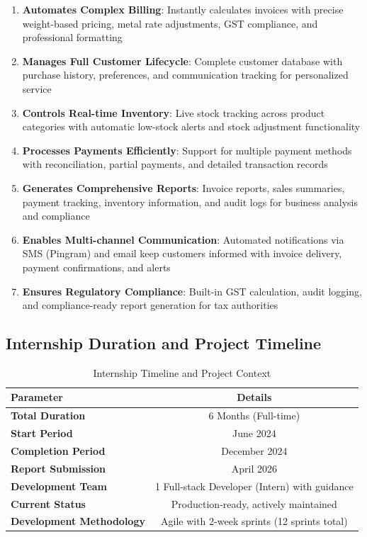\documentclass[12pt,a4paper]{report}
\begin{document}
\begin{enumerate}[label=\roman*)]
    \item \textbf{Automates Complex Billing}: Instantly calculates invoices with precise weight-based pricing, metal rate adjustments, GST compliance, and professional formatting
    \item \textbf{Manages Full Customer Lifecycle}: Complete customer database with purchase history, preferences, and communication tracking for personalized service
    \item \textbf{Controls Real-time Inventory}: Live stock tracking across product categories with automatic low-stock alerts and stock adjustment functionality
    \item \textbf{Processes Payments Efficiently}: Support for multiple payment methods with reconciliation, partial payments, and detailed transaction records
    \item \textbf{Generates Comprehensive Reports}: Invoice reports, sales summaries, payment tracking, inventory information, and audit logs for business analysis and compliance
    \item \textbf{Enables Multi-channel Communication}: Automated notifications via SMS (Pingram) and email keep customers informed with invoice delivery, payment confirmations, and alerts
    \item \textbf{Ensures Regulatory Compliance}: Built-in GST calculation, audit logging, and compliance-ready report generation for tax authorities
\end{enumerate}

\subsection{Internship Duration and Project Timeline}

\begin{table}[H]
    \centering
    \begin{tabular}{|l|c|}
        \hline
        \textbf{Parameter} & \textbf{Details} \\
        \hline
        \textbf{Total Duration} & 6 Months (Full-time) \\
        \hline
        \textbf{Start Period} & June 2024 \\
        \hline
        \textbf{Completion Period} & December 2024 \\
        \hline
        \textbf{Report Submission} & April 2026 \\
        \hline
        \textbf{Development Team} & 1 Full-stack Developer (Intern) with guidance \\
        \hline
        \textbf{Current Status} & Production-ready, actively maintained \\
        \hline
        \textbf{Development Methodology} & Agile with 2-week sprints (12 sprints total) \\
        \hline
    \end{tabular}
    \caption{Internship Timeline and Project Context}
\end{table}
\end{document}
